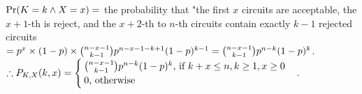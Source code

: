 \begin{pr}
$\P(K=k\land X=x)\\
=$ the probability that "the first $x$ circuits are acceptable, the $x+1$-th is reject, and the $x+2$-th to $n$-th circuits contain exactly $k-1$ rejected circuits\\
$=p^x\times(1-p)\times\binom{n-x-1}{k-1}p^{n-x-1-k+1}(1-p)^{k-1}\\
=\binom{n-x-1}{k-1}p^{n-k}(1-p)^k$.\\
$\so P_{K, X}(k, x)=\begin{cases}
\binom{n-x-1}{k-1}p^{n-k}(1-p)^k\text{, if }k+x\leq n, k\geq1, x\geq0\\
0\text{, otherwise}
\end{cases}$.
\end{pr}
